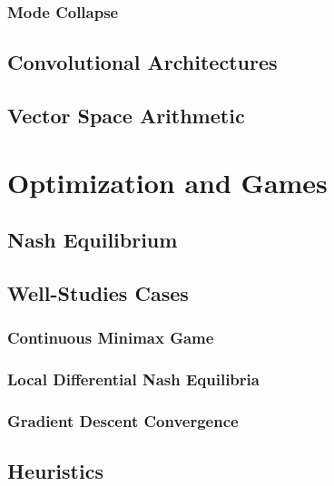 			\subsubsection{Mode Collapse} %

		\subsection{Convolutional Architectures} %

		\subsection{Vector Space Arithmetic} %

	\section{Optimization and Games} %

		\subsection{Nash Equilibrium} %

		\subsection{Well-Studies Cases} %

			\subsubsection{Continuous Minimax Game} %

			\subsubsection{Local Differential Nash Equilibria} %

			\subsubsection{Gradient Descent Convergence} %

		\subsection{Heuristics} %

